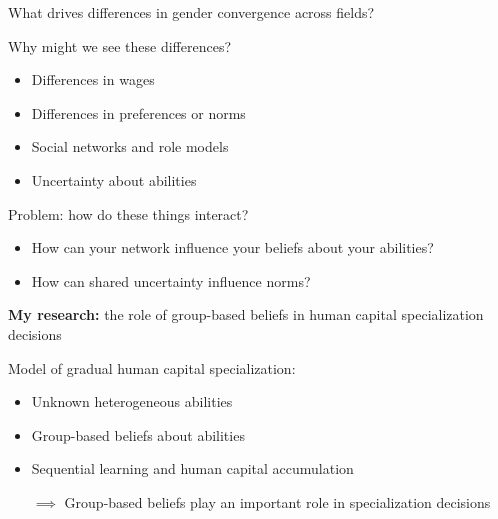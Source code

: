\documentclass[compress, 8pt]{beamer}
\begin{document}
\begin{frame}{What drives differences in gender convergence across fields?}


Why might we see these differences?
\begin{itemize}
    \item Differences in wages
    \item Differences in preferences or norms
    \item Social networks and role models
    \item Uncertainty about abilities
\end{itemize}

\vspace{2ex}
Problem: how do these things interact?
\begin{itemize}
    \item How can your network influence your beliefs about your abilities?
    \item How can shared uncertainty influence norms? 
\end{itemize}


\pause
\vspace{2ex}
\textbf{My research:} the role of group-based beliefs in human capital specialization decisions

\vspace{2ex}
Model of gradual human capital specialization:
\begin{itemize}
    \item Unknown heterogeneous abilities 
    \item Group-based beliefs about abilities 
    \item Sequential learning and human capital accumulation
    \item [$\implies$] Group-based beliefs play an important role in specialization decisions
\end{itemize}

\end{frame}
\end{document}
